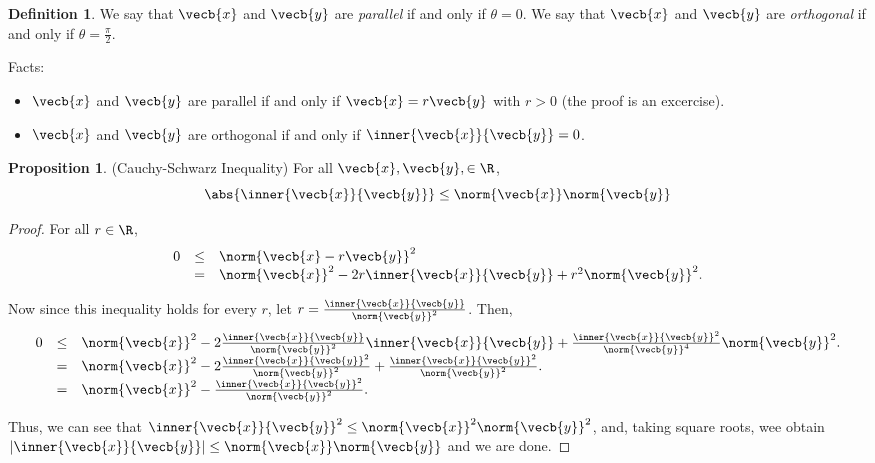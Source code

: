 \documentclass[a5paper]{article}
\theoremstyle{definition}%
\newtheorem{proposition}[theorem]{Proposition}
\newtheorem*{definition*}{Definition}
\numberwithin{exercise}{section}
\theoremstyle{remark}%
\begin{document}
\begin{definition*}
We say that $\vecb{x}$ and $\vecb{y}$ are \emph{parallel} if and only if $\theta=0$. 
We say that $\vecb{x}$ and $\vecb{y}$ are \emph{orthogonal} if and only if $\theta=\frac{\pi}{2}$. 
\end{definition*}

Facts: 
\begin{itemize}
\item $\vecb{x}$ and $\vecb{y}$ are parallel if and only if $\vecb{x}=r\vecb{y}$ with $r>0$ (the proof is an excercise). 
\item $\vecb{x}$ and $\vecb{y}$ are orthogonal if and only if $\inner{\vecb{x}}{\vecb{y}}=0$. 
\end{itemize}

\begin{highlight}
\begin{proposition}(Cauchy-Schwarz Inequality)
For all $\vecb{x}, \vecb{y}, \in \R$, 
$$\abs{\inner{\vecb{x}}{\vecb{y}}}\leq \norm{\vecb{x}}\norm{\vecb{y}}$$
\end{proposition}
\end{highlight}
\begin{proof}
For all $r\in\R$, 
\[\begin{array}{rcl}
0&\leq&\norm{\vecb{x}-r\vecb{y}}^2\\
&=&\norm{\vecb{x}}^2-2r\inner{\vecb{x}}{\vecb{y}}+r^2\norm{\vecb{y}}^2.
\end{array}\]

Now since this inequality holds for every $r$, let $r=\frac{\inner{\vecb{x}}{\vecb{y}}}{\norm{\vecb{y}}^2}$. Then, 
\[\begin{array}{rcl}
0&\leq&\norm{\vecb{x}}^2-2\frac{\inner{\vecb{x}}{\vecb{y}}}{\norm{\vecb{y}}^2}\inner{\vecb{x}}{\vecb{y}}+\frac{\inner{\vecb{x}}{\vecb{y}}^2}{\norm{\vecb{y}}^4}\norm{\vecb{y}}^2.\\
&=&\norm{\vecb{x}}^2-2\frac{\inner{\vecb{x}}{\vecb{y}}^2}{\norm{\vecb{y}}^2}+\frac{\inner{\vecb{x}}{\vecb{y}}^2}{\norm{\vecb{y}}^2}.\\
&=&\norm{\vecb{x}}^2-\frac{\inner{\vecb{x}}{\vecb{y}}^2}{\norm{\vecb{y}}^2}.
\end{array}\]

Thus, we can see that $\inner{\vecb{x}}{\vecb{y}}^2\leq\norm{\vecb{x}}^2\norm{\vecb{y}}^2$, and, taking square roots, wee obtain $\left|\inner{\vecb{x}}{\vecb{y}}\right|\leq\norm{\vecb{x}}\norm{\vecb{y}}$ and we are done. 
\end{proof}
\end{document}
